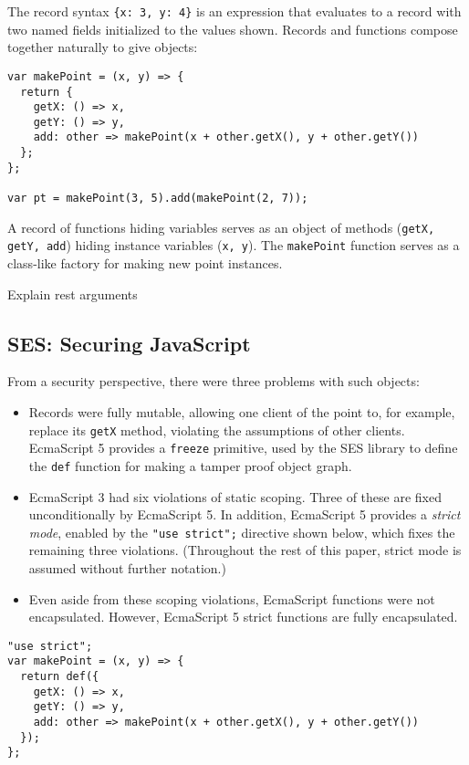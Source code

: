 \documentclass{llncs}
\begin{document}
The record syntax {\tt \{x: 3, y: 4\}} is an expression that evaluates to a record with two named fields initialized to the values shown. Records and functions compose together naturally to give objects:

\begin{verbatim}
var makePoint = (x, y) => {
  return {
    getX: () => x,
    getY: () => y,
    add: other => makePoint(x + other.getX(), y + other.getY())
  };
};

var pt = makePoint(3, 5).add(makePoint(2, 7));
\end{verbatim}

A record of functions hiding variables serves as an object of methods ({\tt getX, getY, add}) hiding instance variables ({\tt x, y}). The {\tt makePoint} function serves as a class-like factory for making new point instances.

Explain rest arguments

\subsection{SES: Securing JavaScript}

From a security perspective, there were three problems with such objects: 
\begin{itemize}
\item Records were fully mutable, allowing one client of the point to, for example, replace its {\tt getX} method, violating the assumptions of other clients. EcmaScript 5 provides a {\tt freeze} primitive, used by the SES library to define the {\tt def} function for making a tamper proof object graph.
\item EcmaScript 3 had six violations of static scoping. Three of these are fixed unconditionally by EcmaScript 5. In addition, EcmaScript 5 provides a \emph{strict mode}, enabled by the {\tt "use strict";} directive shown below, which fixes the remaining three violations. (Throughout the rest of this paper, strict mode is assumed without further notation.)  
\item Even aside from these scoping violations, EcmaScript functions were not encapsulated. However, EcmaScript 5 strict functions are fully encapsulated.
\end{itemize}

\begin{verbatim}
"use strict";
var makePoint = (x, y) => {
  return def({
    getX: () => x,
    getY: () => y,
    add: other => makePoint(x + other.getX(), y + other.getY())
  });
};
\end{verbatim}
\end{document}
